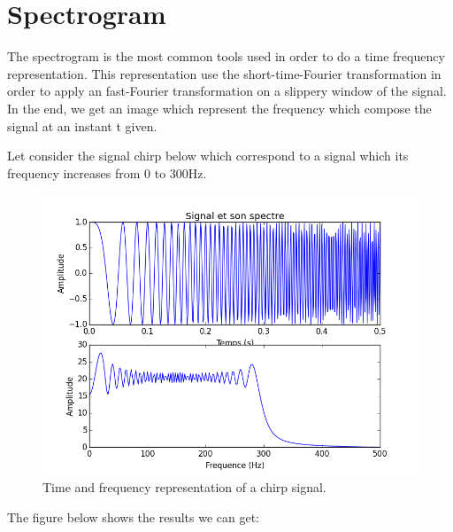 
\chapter{Spectrogram}

The spectrogram is the most common tools used in order to do a time frequency representation. This representation use the short-time-Fourier transformation in order to apply an fast-Fourier transformation on a slippery window of the signal. In the end, we get an image which represent the frequency which compose the signal at an instant t given.

Let consider the signal chirp below which correspond to a signal which its frequency increases from 0 to 300Hz.

\begin{figure}[H]
\centering
    \includegraphics[scale=0.6,angle=0]{Images/ChirpTF.png}
    \caption{Time and frequency representation of a chirp signal.}
    \label{fig:ChirpTF}
\end{figure}

The figure below shows the results we can get:

